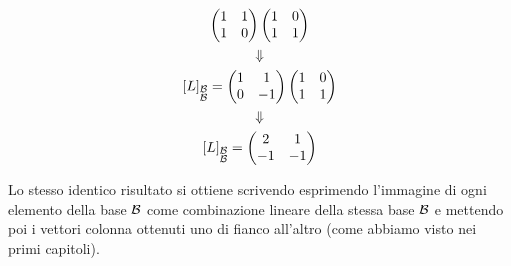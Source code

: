 \begin{example}
\begin{enumerate}
\begin{gather*}
			      \begin{pmatrix}
				      1 & 1 \\
				      1 & 0
			      \end{pmatrix}
			      \begin{pmatrix}
				      1 & 0 \\
				      1 & 1
			      \end{pmatrix} \\
			      \Downarrow \\
			      [L]_{\substack{\mathcal{B} \\ \mathcal{B}}} =
			      \begin{pmatrix}
				      1 & 1  \\
				      0 & -1
			      \end{pmatrix}
			      \begin{pmatrix}
				      1 & 0 \\
				      1 & 1
			      \end{pmatrix} \\
			      \Downarrow \\
			      [L]_{\substack{\mathcal{B} \\ \mathcal{B}}} =
			      \begin{pmatrix}
				      2  & 1  \\
				      -1 & -1
			      \end{pmatrix}
		      \end{gather*}
	\end{enumerate}
	Lo stesso identico risultato si ottiene scrivendo esprimendo
	l'immagine di ogni elemento della base $\mathcal{B}$ come combinazione lineare
	della stessa base $\mathcal{B}$ e mettendo poi i vettori colonna ottenuti
	uno di fianco all'altro (come abbiamo visto nei primi capitoli).
\end{example}